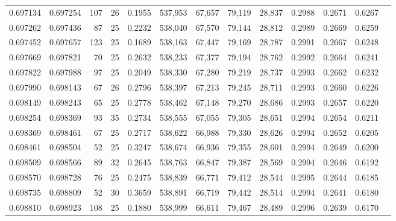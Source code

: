 \begin{tabular}{rrrrrrrrrrrrr}
0.697134 & 0.697254 &   107 &  26 &                                     0.1955 & 537,953 &  67,657 &  79,119 &  28,837 & 0.2988 & 0.2671 & 0.6267 \\
0.697262 & 0.697436 &    87 &  25 &                                     0.2232 & 538,040 &  67,570 &  79,144 &  28,812 & 0.2989 & 0.2669 & 0.6259 \\
0.697452 & 0.697657 &   123 &  25 &                                     0.1689 & 538,163 &  67,447 &  79,169 &  28,787 & 0.2991 & 0.2667 & 0.6248 \\
0.697669 & 0.697821 &    70 &  25 &                                     0.2632 & 538,233 &  67,377 &  79,194 &  28,762 & 0.2992 & 0.2664 & 0.6241 \\
0.697822 & 0.697988 &    97 &  25 &                                     0.2049 & 538,330 &  67,280 &  79,219 &  28,737 & 0.2993 & 0.2662 & 0.6232 \\
0.697990 & 0.698143 &    67 &  26 &                                     0.2796 & 538,397 &  67,213 &  79,245 &  28,711 & 0.2993 & 0.2660 & 0.6226 \\
0.698149 & 0.698243 &    65 &  25 &                                     0.2778 & 538,462 &  67,148 &  79,270 &  28,686 & 0.2993 & 0.2657 & 0.6220 \\
0.698254 & 0.698369 &    93 &  35 &                                     0.2734 & 538,555 &  67,055 &  79,305 &  28,651 & 0.2994 & 0.2654 & 0.6211 \\
0.698369 & 0.698461 &    67 &  25 &                                     0.2717 & 538,622 &  66,988 &  79,330 &  28,626 & 0.2994 & 0.2652 & 0.6205 \\
0.698461 & 0.698504 &    52 &  25 &                                     0.3247 & 538,674 &  66,936 &  79,355 &  28,601 & 0.2994 & 0.2649 & 0.6200 \\
0.698509 & 0.698566 &    89 &  32 &                                     0.2645 & 538,763 &  66,847 &  79,387 &  28,569 & 0.2994 & 0.2646 & 0.6192 \\
0.698570 & 0.698728 &    76 &  25 &                                     0.2475 & 538,839 &  66,771 &  79,412 &  28,544 & 0.2995 & 0.2644 & 0.6185 \\
0.698735 & 0.698809 &    52 &  30 &                                     0.3659 & 538,891 &  66,719 &  79,442 &  28,514 & 0.2994 & 0.2641 & 0.6180 \\
0.698810 & 0.698923 &   108 &  25 &                                     0.1880 & 538,999 &  66,611 &  79,467 &  28,489 & 0.2996 & 0.2639 & 0.6170 \\

\end{tabular}
